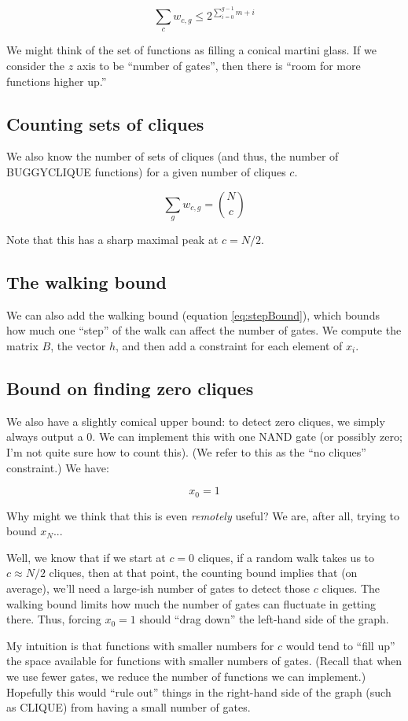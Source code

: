 \documentclass[12pt]{article}
\theoremstyle{definition}
\begin{document}
\[
\sum_c w_{c,g} \le 2^{\sum_{i=0}^{g-1} m+i}
\]

We might think of the set of functions as filling a conical
martini glass. If we consider the $z$ axis to be ``number of gates'',
then there is ``room for more functions higher up.''

\subsection{Counting sets of cliques}

We also know the number of sets of cliques (and thus, the number
of BUGGYCLIQUE functions) for a given number of cliques $c$.

\[
\sum_g w_{c,g} = {N \choose c}
\]

Note that this has a sharp maximal peak at $c = N/2$.

\subsection{The walking bound}

We can also add the walking bound (equation \ref{eq:stepBound}), which bounds how much
one ``step'' of the walk can affect the number of gates.
We compute the matrix $B$, the vector $h$, and then add a constraint for each element of $x_i$.

\subsection{Bound on finding zero cliques}

We also have a slightly comical upper bound:
to detect zero cliques, we simply always
output a 0. We can implement this with one NAND gate (or possibly zero;
I'm not quite sure how to count this). (We refer to this as the
``no cliques'' constraint.) We have:

\[
x_0 = 1
\]

Why might we think that this is even {\em remotely} useful? We are, after
all, trying to bound $x_N$...

Well, we know that if we start at $c=0$ cliques, if a random walk takes us to
$c \approx N/2$ cliques, then at that point, the counting bound implies that
(on average), we'll need a large-ish number of gates to detect those $c$ cliques.
The walking bound limits how much the number of gates can fluctuate
in getting there. Thus, forcing $x_0=1$ should ``drag down'' the left-hand side of the graph.

My intuition is that functions with smaller numbers for $c$ would
tend to ``fill up'' the space available for functions with smaller numbers of gates.
(Recall that when we use fewer gates, we reduce the number of functions we can implement.)
Hopefully this would ``rule out'' things in the right-hand side of the graph (such as CLIQUE)
from having a small number of gates.
\end{document}
